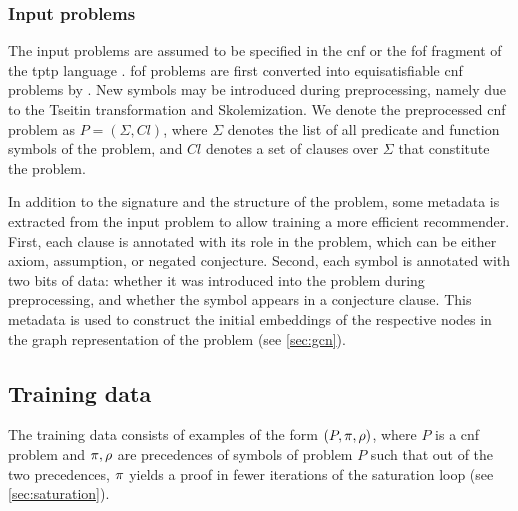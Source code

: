 
\subsubsection{Input problems}

The input problems are assumed to be specified in the \gls{cnf} or the \gls{fof} fragment
of the \acrshort{tptp} language \cite{Sutcliffe2017}.
\Gls{fof} problems are first converted into equisatisfiable \gls{cnf} problems by \Vampire{}.
New symbols may be introduced during preprocessing,
namely due to the Tseitin transformation and Skolemization.
We denote the preprocessed \gls{cnf} problem as $P = (\Sigma, \mathit{Cl})$,
where $\Sigma$ denotes the list of all predicate and function symbols of the problem,
and $\mathit{Cl}$ denotes a set of clauses over $\Sigma$ that constitute the problem.

In addition to the signature and the structure of the problem,
some metadata is extracted from the input problem to allow training a more efficient recommender.
First, each clause is annotated with its role in the problem,
which can be either axiom, assumption, or negated conjecture.
Second, each symbol is annotated with two bits of data:
whether it was introduced into the problem during preprocessing,
and whether the symbol appears in a conjecture clause.
This metadata is used to construct the initial embeddings of the respective nodes
in the graph representation of the problem (see \cref{sec:gcn}).

\subsection{Training data}

The training data consists of examples of the form $(P, \pi, \rho)$,
where $P$ is a \gls{cnf} problem and $\pi, \rho$ are precedences of symbols of problem $P$
such that out of the two precedences, $\pi$ yields a proof in fewer iterations of the saturation loop (see \cref{sec:saturation}).

